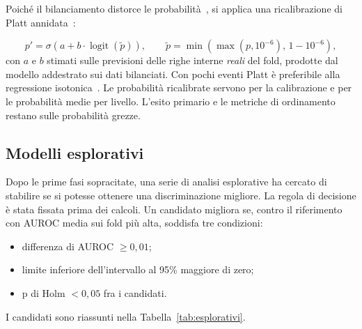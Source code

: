 \documentclass[a4paper, 12pt, oneside]{book}
\begin{document}
Poiché il bilanciamento distorce le probabilità~\cite{dal_pozzolo_calibrating_2015,van_den_goorbergh_harm_2022}, si applica una ricalibrazione di Platt annidata~\cite{platt_probabilities_2000}:

\begin{equation}
	p' = \sigma\!\left(a + b \cdot \operatorname{logit}(\tilde p)\right), \qquad \tilde p = \min\!\left(\max(p, 10^{-6}),\, 1 - 10^{-6}\right),
\end{equation}
con $a$ e $b$ stimati sulle previsioni delle righe interne \emph{reali} del fold, prodotte dal modello addestrato sui dati bilanciati. Con pochi eventi Platt è preferibile alla regressione isotonica~\cite{niculescu-mizil_predicting_2005}. Le probabilità ricalibrate servono per la calibrazione e per le probabilità medie per livello. L'esito primario e le metriche di ordinamento restano sulle probabilità grezze.

\subsection{Modelli esplorativi}

Dopo le prime fasi sopracitate, una serie di analisi esplorative ha cercato di stabilire se si potesse ottenere una discriminazione migliore. La regola di decisione è stata fissata prima dei calcoli. Un candidato migliora se, contro il riferimento con AUROC media sui fold più alta, soddisfa tre condizioni:
\begin{itemize}
	\item differenza di AUROC $\geq 0{,}01$;
	\item limite inferiore dell'intervallo al 95\% maggiore di zero;
	\item p di Holm $< 0{,}05$ fra i candidati.
\end{itemize}
I candidati sono riassunti nella Tabella~\ref{tab:esplorativi}.
\end{document}
